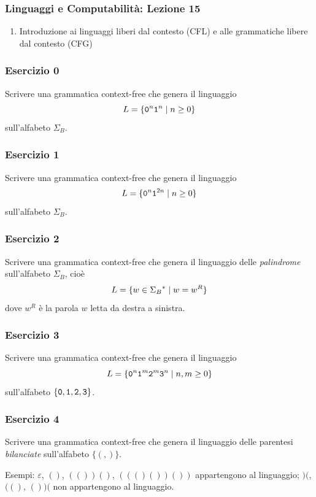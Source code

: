 




\begin{frame}[fragile]
	\frametitle{Linguaggi e Computabilità: Lezione 15}
\begin{enumerate}
\item
Introduzione ai linguaggi liberi dal contesto (CFL) e alle grammatiche libere dal contesto (CFG)
\end{enumerate}
\end{frame}


\begin{frame}
        \frametitle{Esercizio 0}
	Scrivere una grammatica context-free che genera il linguaggio
	\[
                L = \{ \mathtt{0}^{n} \mathtt{1}^{n} \; \vert \; n \ge 0 \}
	\]
	sull'alfabeto $\Sigma_{B}$.
\end{frame}



\begin{frame}
	\frametitle{Esercizio 1}
	Scrivere una grammatica context-free che genera il linguaggio
	\[
		L = \{ \mathtt{0}^{n} \mathtt{1}^{2n} \; \vert \; n \ge 0 \}
	\]
	sull'alfabeto $\Sigma_{B}$.
\end{frame}


\begin{frame}
	\frametitle{Esercizio 2}
	Scrivere una grammatica context-free che genera il linguaggio delle
	\emph{palindrome} sull'alfabeto $\Sigma_{B}$, cioè
	\[
		L = \{ w \in \Sigma_{B}{}^{\ast} \; \vert \; w = w^{R} \}
	\]
	dove $w^{R}$ è la parola $w$ letta da destra a sinistra.
\end{frame}


\begin{frame}
	\frametitle{Esercizio 3}
	Scrivere una grammatica context-free che genera il linguaggio
	\[
		L = \{ \mathtt{0}^{n} \mathtt{1}^{m} \mathtt{2}^{m} \mathtt{3}^{n} \; \vert \; n, m \ge 0 \}
	\]
	sull'alfabeto $\{\mathtt{0}, \mathtt{1}, \mathtt{2}, \mathtt{3}\}$.
\end{frame}


\begin{frame}
	\frametitle{Esercizio 4}
	Scrivere una grammatica context-free che genera il linguaggio delle
	parentesi \emph{bilanciate} sull'alfabeto $\{ (, ) \}$.

	\bigskip
	Esempi: $\varepsilon$, $()$, $(())()$, $((()())())$ appartengono al linguaggio;
	$)($, $(()$, $())($ non appartengono al linguaggio.
\end{frame}



